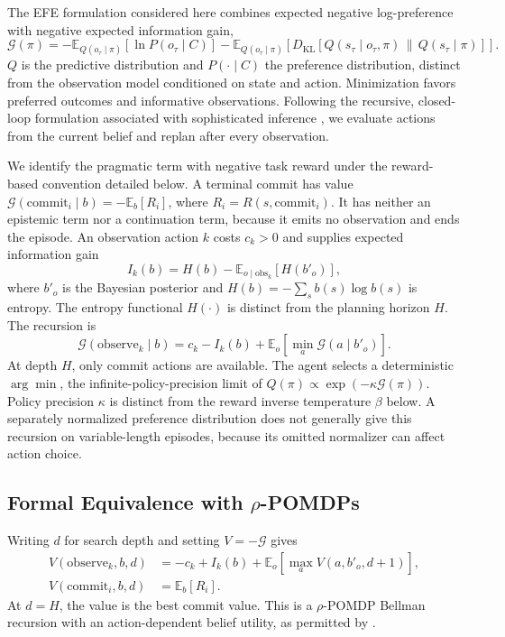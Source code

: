 The EFE formulation considered here combines expected negative log-preference with negative expected information gain,
\begin{equation}
\mathcal G(\pi) = -\mathbb E_{Q(o_\tau\mid\pi)}[\ln P(o_\tau\mid C)]
-\mathbb E_{Q(o_\tau\mid\pi)}\!\left[D_{\mathrm{KL}}\!\left[Q(s_\tau\mid o_\tau,\pi)\,\|\,Q(s_\tau\mid\pi)\right]\right].
\end{equation}
$Q$ is the predictive distribution and $P(\cdot\mid C)$ the preference distribution, distinct from the observation model conditioned on state and action. Minimization favors preferred outcomes and informative observations. Following the recursive, closed-loop formulation associated with sophisticated inference \citep{friston2021,dacosta2020b}, we evaluate actions from the current belief and replan after every observation.

We identify the pragmatic term with negative task reward under the reward-based convention detailed below. A terminal commit has value $\mathcal G(\mathrm{commit}_i\mid b)=-\mathbb E_b[R_i]$, where $R_i=R(s,\mathrm{commit}_i)$. It has neither an epistemic term nor a continuation term, because it emits no observation and ends the episode. An observation action $k$ costs $c_k>0$ and supplies expected information gain
\[
I_k(b)=H(b)-\mathbb E_{o\mid\mathrm{obs}_k}[H(b'_o)],
\]
where $b'_o$ is the Bayesian posterior and $H(b)=-\sum_s b(s)\log b(s)$ is entropy. The entropy functional $H(\cdot)$ is distinct from the planning horizon $H$. The recursion is
\begin{equation}
\mathcal G(\mathrm{observe}_k\mid b)=c_k-I_k(b)+\mathbb E_o\!\left[\min_a\mathcal G(a\mid b'_o)\right].
\label{eq:efe_recursive}
\end{equation}
At depth $H$, only commit actions are available. The agent selects a deterministic $\arg\min$, the infinite-policy-precision limit of $Q(\pi)\propto\exp(-\kappa\mathcal G(\pi))$. Policy precision $\kappa$ is distinct from the reward inverse temperature $\beta$ below. A separately normalized preference distribution does not generally give this recursion on variable-length episodes, because its omitted normalizer can affect action choice.

\subsection{Formal Equivalence with $\rho$-POMDPs}
\label{subsec:formal_rho_equiv}

Writing $d$ for search depth and setting $V=-\mathcal G$ gives
\begin{align}
V(\mathrm{observe}_k,b,d)&=-c_k+I_k(b)+\mathbb E_o\!\left[\max_a V(a,b'_o,d+1)\right],\label{eq:bellman_obs}\\
V(\mathrm{commit}_i,b,d)&=\mathbb E_b[R_i].\label{eq:bellman_commit}
\end{align}
At $d=H$, the value is the best commit value. This is a $\rho$-POMDP Bellman recursion with an action-dependent belief utility, as permitted by \citet{araya2010}.

